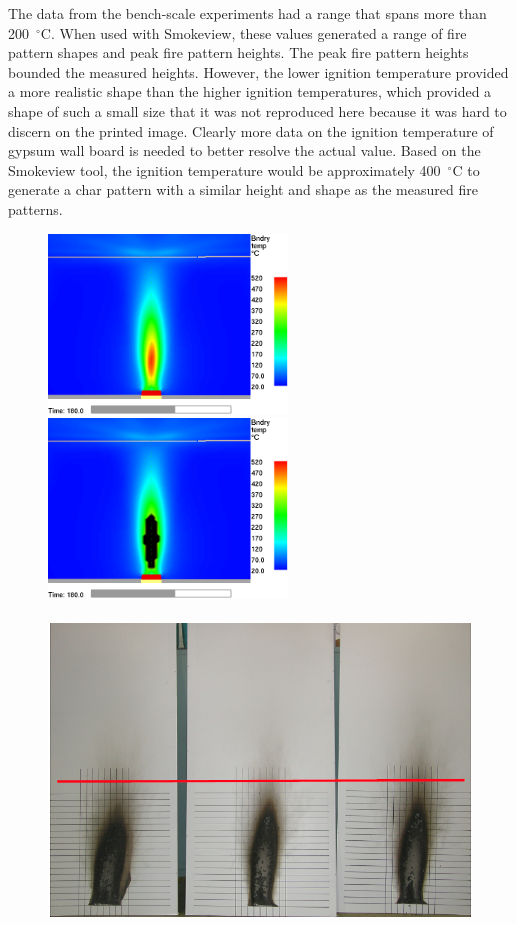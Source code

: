 \documentclass[twoside]{uocthesis}
\begin{document}
{The data from the bench-scale experiments had a range that spans more than 200~$^\circ$C. When used with Smokeview, these values generated a range of fire pattern shapes and peak fire pattern heights.  The peak fire pattern heights bounded the measured heights. However, the lower ignition temperature provided a more realistic shape than the higher ignition temperatures, which provided a shape of such a small size that it was not reproduced here because it was hard to discern on the printed image.  Clearly more data on the ignition temperature of gypsum wall board is needed to better resolve the actual value.  Based on the Smokeview tool, the ignition temperature would be approximately 400~$^\circ$C to generate a char pattern with a similar height and shape as the measured fire patterns.

\begin{figure}[h]
  \centering
  \includegraphics[width=2.5in]{../Figures/WallTemp_10mm_0D_0_8m_guideline}
  \includegraphics[width=2.5in]{../Figures/350CThresholdwall_temp_0_8m_guideline}\\
  \hspace{4 mm}  \\ 
  \includegraphics[width=.625\columnwidth]{../Figures/GBNGreps_w_1m_guideline}\\

\end{figure}}
\end{document}
